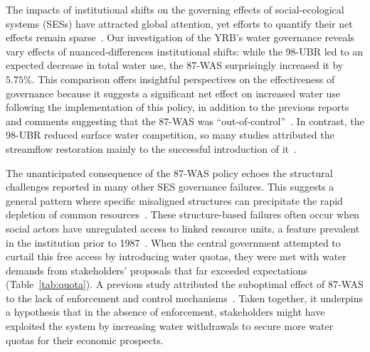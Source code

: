 
The impacts of institutional shifts on the governing effects of social-ecological systems (SESs) have attracted global attention, yet efforts to quantify their net effects remain sparse~\cite{cumming2020a}.
Our investigation of the YRB's water governance reveals vary effects of nuanced-differences institutional shifts: while the 98-UBR led to an expected decrease in total water use, the 87-WAS surprisingly increased it by $5.75\%$.
This comparison offers insightful perspectives on the effectiveness of governance because it suggests a significant net effect on increased water use following the implementation of this policy, in addition to the previous reports and comments suggesting that the 87-WAS was ``out-of-control''~\cite{wang2019d, departmentofearthsciences1999}.
In contrast, the 98-UBR reduced surface water competition, so many studies attributed the streamflow restoration mainly to the successful introduction of it~\cite{chen2021,huangang2002,an2007}.

The unanticipated consequence of the 87-WAS policy echoes the structural challenges reported in many other SES governance failures.
This suggests a general pattern where specific misaligned structures can precipitate the rapid depletion of common resources~\cite{kellenberg2009,cai2016,barnes2019}.
These structure-based failures often occur when social actors have unregulated access to linked resource units, a feature prevalent in the institution prior to 1987~\cite{wang2019c}.
When the central government attempted to curtail this free access by introducing water quotas, they were met with water demands from stakeholders' proposals that far exceeded expectations (Table~\ref{tab:quota}).
A previous study attributed the suboptimal effect of 87-WAS to the lack of enforcement and control mechanisms~\cite{huangang2002}.
Taken together, it underpins a hypothesis that in the absence of enforcement, stakeholders might have exploited the system by increasing water withdrawals to secure more water quotas for their economic prospects.

